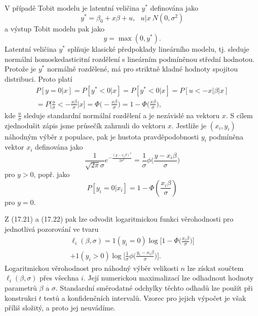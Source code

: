 V případě Tobit modelu je latentní veličina $y^*$ definována jako
\begin{equation}
y^* = \beta_0 + x \beta + u, ~~~ u|x ~ N(0, \sigma^2)
\end{equation}
a výstup Tobit modelu pak jako
\begin{equation}
y = \max(0, y^*).
\end{equation}
Latentní veličina $y^*$ splňuje klasické předpoklady lineárního modelu, tj. sleduje normální homoskedasticitní rozdělení s lineárním podmíněnou střední hodnotou. Protože je $y^*$ normálně rozdělené, má pro striktně kladné hodnoty spojitou distribuci. Proto platí
\begin{multline}
P[y = 0 | x] = P[y^* < 0 | x] = P[y^* < 0 | x] = P[u < -x|\beta|x]\\
=P\Big[\frac{u}{\sigma} < -\frac{x\beta}{\sigma}|x\Big] = \Phi\Big(-\frac{x \beta}{\sigma}\Big) = 1 - \Phi\Big(\frac{x\beta}{\sigma}\Big),
\end{multline}
kde $\frac{u}{\sigma}$ sleduje standardní normální rozdělení a je nezávislé na vektoru $x$. S cílem zjednodušit zápis jsme průsečík zahrnuli do vektoru $x$. Jestliže je $(x_i, y_i)$ náhodným výběr z populace, pak je hustota pravděpodobnosti $y_i$ podmíněna vektor $x_i$ definována jako
\begin{equation}
\frac{1}{\sqrt{2 \pi} \sigma} e^{-\frac{(y - x_i \beta)^2}{2 \sigma^2}} = \frac{1}{\sigma}\phi\Big(\frac{y - x_i \beta}{\sigma}\Big)
\end{equation}
pro $y > 0$, popř. jako
\begin{equation}
P[y_i = 0 | x_i] = 1 - \Phi(\frac{x_i \beta}{\sigma})
\end{equation}
pro $y = 0$.

Z (17.21) a (17.22) pak lze odvodit logaritmickou funkci věrohodnosti pro jednotlivá pozorování ve tvaru
\begin{multline}
\ell_i(\beta, \sigma) = 1(y_i = 0) \log\Big[1 - \Phi\Big(\frac{x_i \beta}{\sigma}\Big)\Big]\\
+ 1(y_i > 0) \log\Big[\frac{1}{\sigma} \phi\Big(\frac{y_i - x_i \beta}{\sigma}\Big)\Big].
\end{multline}
Logaritmickou věrohodnost pro náhodný výběr velikosti $n$ lze získat součtem $\ell_i(\beta, \sigma)$ přes všechna $i$. Její numerickou maximalizací lze odhadnout hodnoty parametrů $\beta$ a $\sigma$. Standardní směrodatné odchylky těchto odhadů lze použít při konstrukci $t$ testů a konfidenčních intervalů. Vzorec pro jejich výpočet je však příliš složitý, a proto jej neuvádíme.

